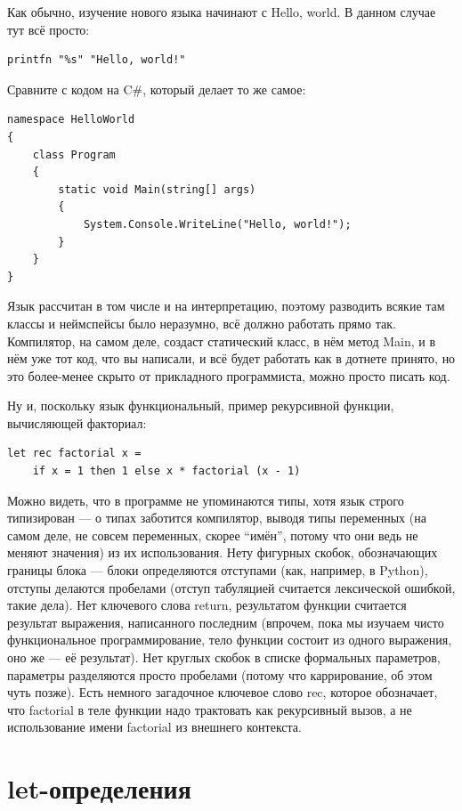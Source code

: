 \documentclass[a5paper]{article}
\begin{document}
Как обычно, изучение нового языка начинают с Hello, world. В данном случае тут всё просто:

\begin{verbatim}
printfn "%s" "Hello, world!"
\end{verbatim}

Сравните с кодом на C\#, который делает то же самое:

\begin{verbatim}
namespace HelloWorld
{
    class Program
    {
        static void Main(string[] args)
        {
            System.Console.WriteLine("Hello, world!");
        }
    }
}
\end{verbatim}

Язык рассчитан в том числе и на интерпретацию, поэтому разводить всякие там классы и неймспейсы было неразумно, всё должно работать прямо так. Компилятор, на самом деле, создаст статический класс, в нём метод Main, и в нём уже тот код, что вы написали, и всё будет работать как в дотнете принято, но это более-менее скрыто от прикладного программиста, можно просто писать код.

Ну и, поскольку язык функциональный, пример рекурсивной функции, вычисляющей факториал:

\begin{verbatim}
let rec factorial x =
    if x = 1 then 1 else x * factorial (x - 1)
\end{verbatim}

Можно видеть, что в программе не упоминаются типы, хотя язык строго типизирован --- о типах заботится компилятор, выводя типы переменных (на самом деле, не совсем переменных, скорее ``имён'', потому что они ведь не меняют значения) из их использования. Нету фигурных скобок, обозначающих границы блока --- блоки определяются отступами (как, например, в Python), отступы делаются пробелами (отступ табуляцией считается лексической ошибкой, такие дела). Нет ключевого слова return, результатом функции считается результат выражения, написанного последним (впрочем, пока мы изучаем чисто функциональное программирование, тело функции состоит из одного выражения, оно же --- её результат). Нет круглых скобок в списке формальных параметров, параметры разделяются просто пробелами (потому что каррирование, об этом чуть позже). Есть немного загадочное ключевое слово rec, которое обозначает, что factorial в теле функции надо трактовать как рекурсивный вызов, а не использование имени factorial из внешнего контекста.

\section{let-определения}
\end{document}
